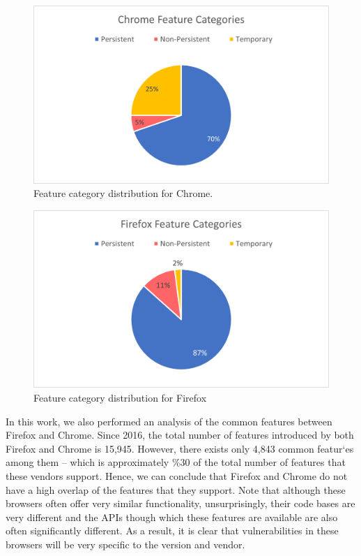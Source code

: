 \begin{figure}[ht]
    \centering
    \includegraphics[width=\columnwidth]{figures/chrome-feature-categories.png}
    \caption{Feature category distribution for Chrome.}
    \label{fig:chrome-categories}
\end{figure}

\begin{figure}[ht]
    \centering
    \includegraphics[width=\columnwidth]{figures/firefox-feature-categories.png}
    \caption{Feature category distribution for Firefox}
    \label{fig:times_bar}
  \end{figure}

  In this work, we also performed an analysis of the common features
  between Firefox and Chrome. Since 2016, the total number of features
  introduced by both Firefox and Chrome is 15,945. However, there
  exists only 4,843 common featur`es among them -- which is
  approximately \%30 of the total number of features that these
  vendors support. Hence, we can conclude that Firefox and Chrome do
  not have a high overlap of the features that they support. Note that
  although these browsers often offer very similar functionality,
  unsurprisingly, their code bases are very different and the APIs
  though which these features are available are also often
  significantly different. As a result, it is clear that
  vulnerabilities in these browsers will be very specific to the
  version and vendor.

